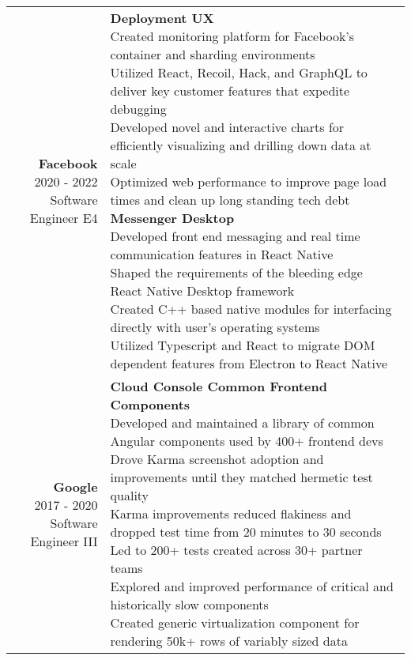 \documentclass{article}
\makeatletter
\newcommand*\lineBr[2][c]{\begin{tabular}[#1]{@{}r@{}}#2\end{tabular}}
\newcommand*\lineBl[2][c]{\begin{tabular}[#1]{@{}l@{}}#2\end{tabular}}
\makeatother
\begin{document}
\begin{tabularx}{\textwidth}{ r | X }
  \vspace{7mm}
  \lineBr{ {\large {\bf Facebook }\\[2mm]2020 - 2022\\[2mm]Software Engineer E4}} &
  \lineBl{
    {\bf Deployment UX} \\[2mm]
    Created monitoring platform for Facebook's container and sharding environments \\[2mm]
    Utilized React, Recoil, Hack, and GraphQL to deliver key customer features that expedite debugging \\[2mm] 
    Developed novel and interactive charts for efficiently visualizing and drilling down data at scale \\[2mm]
    Optimized web performance to improve page load times and clean up long standing tech debt \\[5mm]
    {\bf Messenger Desktop} \\[2mm]
    Developed front end messaging and real time communication features in React Native \\[2mm]
    Shaped the requirements of the bleeding edge React Native Desktop framework \\[2mm]
    Created C++ based native modules for interfacing directly with user's operating systems \\[2mm]
    Utilized Typescript and React to migrate DOM dependent features from Electron to React Native
  } \\
  \vspace{7mm}
  \lineBr{ {\large {\bf Google }\\[2mm]2017 - 2020\\[2mm]Software Engineer III}} &
  \lineBl{
    {\bf Cloud Console Common Frontend Components} \\[2mm]
    Developed and maintained a library of common Angular components used by 400+ frontend devs \\[2mm]
    Drove Karma screenshot adoption and improvements until they matched hermetic test quality \\[2mm]
    Karma improvements reduced flakiness and dropped test time from 20 minutes to 30 seconds \\[2mm]
    Led to 200+ tests created across 30+ partner teams \\[2mm]
    Explored and improved performance of critical and historically slow components \\[2mm]
    Created generic virtualization component for rendering 50k+ rows of variably sized data \\[2mm]
}
\end{tabularx}
\end{document}
